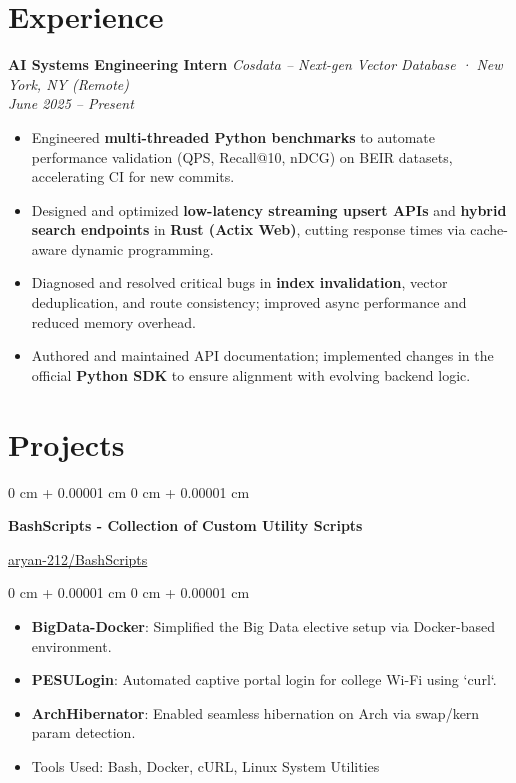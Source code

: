 \documentclass[10pt, letterpaper]{article}
\newenvironment{highlights}{
    \begin{itemize}[
        topsep=0.10 cm,
        parsep=0.10 cm,
        partopsep=0pt,
        itemsep=0pt,
        leftmargin=0 cm + 10pt
    ]
}{
    \end{itemize}
} %
\newenvironment{onecolentry}{
    \begin{adjustwidth}{
        0 cm + 0.00001 cm
    }{
        0 cm + 0.00001 cm
    }
}{
    \end{adjustwidth}
} %
\newenvironment{twocolentry}[2][]{
    \onecolentry
    \def\secondColumn{#2}
    \setcolumnwidth{\fill, 4.5 cm}
    \begin{paracol}{2}
}{
    \switchcolumn \raggedleft \secondColumn
    \end{paracol}
    \endonecolentry
} %
\begin{document}
\section{Experience}

\textbf{AI Systems Engineering Intern} \hfill \textit{Cosdata – Next-gen Vector Database · New York, NY (Remote)} \\
\textit{June 2025 – Present}
\vspace{-0.5em}
\begin{itemize}
  \setlength\itemsep{0.3em}
  \item Engineered \textbf{multi-threaded Python benchmarks} to automate performance validation (QPS, Recall@10, nDCG) on BEIR datasets, accelerating CI for new commits.
  \item Designed and optimized \textbf{low-latency streaming upsert APIs} and \textbf{hybrid search endpoints} in \textbf{Rust (Actix Web)}, cutting response times via cache-aware dynamic programming.
  \item Diagnosed and resolved critical bugs in \textbf{index invalidation}, vector deduplication, and route consistency; improved async performance and reduced memory overhead.
  \item Authored and maintained API documentation; implemented changes in the official \textbf{Python SDK} to ensure alignment with evolving backend logic.
\end{itemize}

\section{Projects}

\begin{twocolentry}{
    \href{https://github.com/aryan-212/BashScripts}{aryan-212/BashScripts}
}
    \textbf{BashScripts - Collection of Custom Utility Scripts}
\end{twocolentry}

\begin{onecolentry}
    \begin{highlights}
        \item \textbf{BigData-Docker}: Simplified the Big Data elective setup via Docker-based environment.
        \item \textbf{PESULogin}: Automated captive portal login for college Wi-Fi using `curl`.
        \item \textbf{ArchHibernator}: Enabled seamless hibernation on Arch via swap/kern param detection.
        \item Tools Used: Bash, Docker, cURL, Linux System Utilities
    \end{highlights}
\end{onecolentry}
\end{document}

